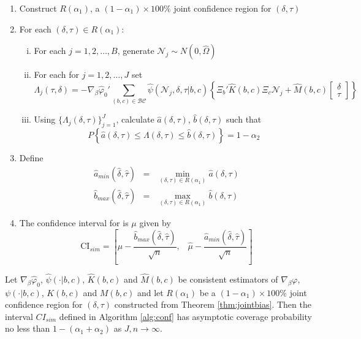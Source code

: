 \begin{alg}
\label{alg:conf}
\mbox{}
\begin{enumerate}
	\item Construct $ R(\alpha_1)$, a $(1-\alpha_1)\times 100\%$ joint confidence region for $(\delta,\tau)$ 
	\item For each $(\delta,\tau)\in R(\alpha_1)$:
		\begin{enumerate}[(i)]
			\item For each $j = 1, 2, \hdots, B$, generate $\mathscr{N}_j \sim N(0, \widehat{\Omega})$
			\item For each for $j = 1, 2, \hdots, J$ set $$\Lambda_j(\tau,\delta)= -\nabla_\beta\widehat{\varphi}_0' \sum_{(b,c) \in \mathcal{BC}} \widehat{\psi}(\mathscr{N}_j,\delta, \tau|b,c) \left\{\Xi_b' \widehat{K}(b,c) \Xi_c \mathscr{N}_j + \widehat{M}(b,c)  \left[\begin{array}{c}\delta \\ \tau \end{array} \right]\right\}$$
			\item Using $\{\Lambda_j(\delta, \tau)\}_{j=1}^J$, calculate $\widehat{a}(\delta,\tau)$, $\widehat{b}(\delta, \tau)$ such that
		$$P\left\{ \widehat{a}(\delta,\tau) \leq\Lambda(\delta,\tau)\leq \widehat{b}(\delta,\tau) \right\} = 1 - \alpha_2$$
		\end{enumerate}
	\item Define
			\begin{eqnarray*}
				\widehat{a}_{min}(\widehat{\delta}, \widehat{\tau})&=& \min_{(\delta,\tau) \in R(\alpha_1)} \widehat{a}(\delta,\tau)\\
				\widehat{b}_{max}(\widehat{\delta}, \widehat{\tau})&=& \max_{(\delta,\tau) \in R(\alpha_1)}\widehat{b}(\delta,\tau)
			\end{eqnarray*}
	\item The confidence interval for is $\mu$ given by
				$$\mbox{CI}_{sim}=\left[ \widehat{\mu} - \frac{\widehat{b}_{max}(\widehat{\delta}, \widehat{\tau})}{\sqrt{n}}, \;\;\; \widehat{\mu} - \frac{\widehat{a}_{min}(\widehat{\delta}, \widehat{\tau})}{\sqrt{n}} \right]$$
\end{enumerate}
\end{alg}

\begin{thm}
\label{pro:sim}
Let $\nabla_{\beta}\widehat{\varphi}_0$, $\widehat{\psi}(\cdot|b,c)$, $\widehat{K}(b,c)$ and $\widehat{M}(b,c)$ be consistent estimators of $\nabla_\beta \varphi$, $\psi(\cdot|b,c)$, $K(b,c)$ and $M(b,c)$ and let $R(\alpha_1)$ be a $(1-\alpha_1)\times 100\%$ joint confidence region for $(\delta,\tau)$ constructed from Theorem \ref{thm:jointbias}.
Then the interval $CI_{sim}$ defined in Algorithm \ref{alg:conf} has asymptotic coverage probability no less than $1-\left( \alpha_1 + \alpha_2 \right)$ as $J,n\rightarrow \infty$. 
\end{thm}
